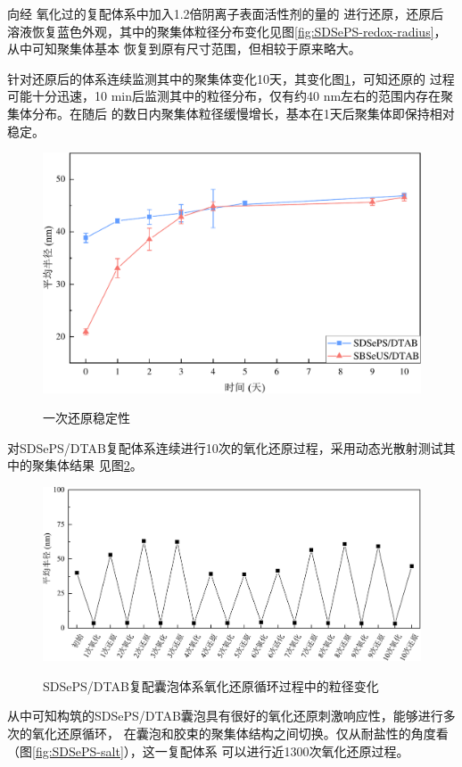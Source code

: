 \documentclass[bachelor,winfonts,replaceperiod]{jnuthesis}
\begin{document}
    向经 氧化过的复配体系中加入1.2倍阴离子表面活性剂的量的 进行还原，还原后
    溶液恢复蓝色外观，其中的聚集体粒径分布变化见图\ref{fig:SDSePS-redox-radius}，从中可知聚集体基本
    恢复到原有尺寸范围，但相较于原来略大。
    
    针对还原后的体系连续监测其中的聚集体变化10天，其变化图\ref{fig:vesicle-Re-stability}，可知还原的
    过程可能十分迅速，10 min后监测其中的粒径分布，仅有约40 nm左右的范围内存在聚集体分布。在随后
    的数日内聚集体粒径缓慢增长，基本在1天后聚集体即保持相对稳定。
    
    \begin{figure}[htbp]
        \centering
        \includegraphics[width=.6\textwidth]{figure/vesicle-Re-stability.pdf}\\
        \caption{一次还原稳定性}\label{fig:vesicle-Re-stability}
    \end{figure}
    
    对SDSePS/DTAB复配体系连续进行10次的氧化还原过程，采用动态光散射测试其中的聚集体结果
    见图\ref{fig:SDSePS-redox-circle}。
    \begin{figure}[htbp]
        \centering
        \includegraphics[width=.86\textwidth]{figure/SDSePS-redox-circle.pdf}\\
        \caption{SDSePS/DTAB复配囊泡体系氧化还原循环过程中的粒径变化}\label{fig:SDSePS-redox-circle}
    \end{figure}
    从中可知构筑的SDSePS/DTAB囊泡具有很好的氧化还原刺激响应性，能够进行多次的氧化还原循环，
    在囊泡和胶束的聚集体结构之间切换。仅从耐盐性的角度看（图\ref{fig:SDSePS-salt}），这一复配体系
    可以进行近1300次氧化还原过程。
    
\end{document}
